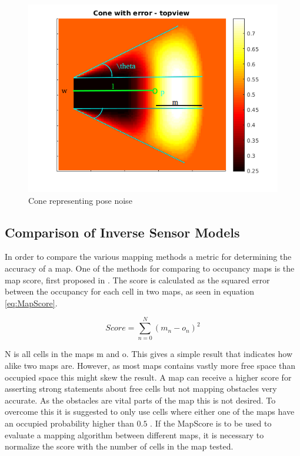 \begin{figure}
	\centering
	\includegraphics[width=\textwidth]{figures/static_mapping/cone_noise_top}
	\caption{Cone representing pose noise}
	\label{fig:cone_with_noise_top}
\end{figure}

\subsection{Comparison of Inverse Sensor Models}
In order to compare the various mapping methods a metric for determining the accuracy of a map. One of the methods for comparing to occupancy maps is the map score, first proposed in \cite{MoravecMartin}. The score is calculated as the squared error between the occupancy for each cell in two maps, as seen in equation \ref{eq:MapScore}.

\begin{equation}
\label{eq:MapScore}
Score = \sum_{n=0}^{N} (m_{n} - o_{n})^2
\end{equation}

N is all cells in the maps m and o. 
This gives a simple result that indicates how alike two maps are. 
However, as most maps contains vastly more free space than occupied space this might skew the result. 
A map can receive a higher score for asserting strong statements about free cells but not mapping obstacles very accurate. 
As the obstacles are vital parts of the map this is not desired. 
To overcome this it is suggested to only use cells where either one of the maps have an occupied probability higher than \(0.5\) \cite{Sullivan2003}. 
If the MapScore is to be used to evaluate a mapping algorithm between different maps, it is necessary to normalize the score with the number of cells in the map tested. 

